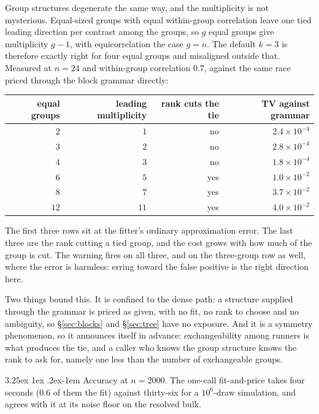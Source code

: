 \documentclass[11pt]{article}
\makeatletter
\renewcommand\paragraph{\@startsection{paragraph}{4}{\z@}%
  {3.25ex \@plus1ex \@minus.2ex}{-1em}%
  {\normalfont\normalsize\itshape}}
\makeatother
\begin{document}
Group structures degenerate the same way, and the multiplicity is not
mysterious. Equal-sized groups with equal within-group correlation leave
one tied leading direction per contrast among the groups, so $g$ equal
groups give multiplicity $g-1$, with equicorrelation the case $g=n$. The
default $k=3$ is therefore exactly right for four equal groups and
misaligned outside that. Measured at $n=24$ and within-group correlation
$0.7$, against the same race priced through the block grammar directly:

\begin{center}\small
\begin{tabular}{rrrr}
\toprule
equal groups & leading multiplicity & rank cuts the tie & TV against grammar\\
\midrule
$2$ & $1$ & no & $2.4\times10^{-4}$\\
$3$ & $2$ & no & $2.8\times10^{-4}$\\
$4$ & $3$ & no & $1.8\times10^{-4}$\\
$6$ & $5$ & yes & $1.0\times10^{-2}$\\
$8$ & $7$ & yes & $3.7\times10^{-2}$\\
$12$ & $11$ & yes & $4.0\times10^{-2}$\\
\bottomrule
\end{tabular}
\end{center}

The first three rows sit at the fitter's ordinary approximation error.
The last three are the rank cutting a tied group, and the cost grows with
how much of the group is cut. The warning fires on all three, and on the
three-group row as well, where the error is harmless: erring toward the
false positive is the right direction here.

Two things bound this. It is confined to the dense path: a structure
supplied through the grammar is priced as given, with no fit, no rank to
choose and no ambiguity, so \S\ref{sec:blocks} and \S\ref{sec:tree} have
no exposure. And it is a symmetry phenomenon, so it announces itself in
advance: exchangeability among runners is what produces the tie, and a
caller who knows the group structure knows the rank to ask for, namely
one less than the number of exchangeable groups.

\paragraph{Accuracy at $n=2000$.} The one-call fit-and-price takes four
seconds ($0.6$ of them the fit) against thirty-six for a $10^6$-draw
simulation, and agrees with it at its noise floor on the resolved bulk.
\end{document}
